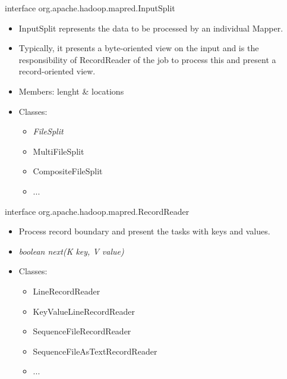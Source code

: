 \documentclass{beamer}
\begin{document}
\begin{frame}{interface org.apache.hadoop.mapred.InputSplit}
    \begin{itemize}
    \item InputSplit represents the data to be processed by an individual Mapper.
    \item Typically, it presents a byte-oriented view on the input and is the responsibility of RecordReader of the job to process this and present a record-oriented view. 
    \item Members: lenght \& locations
    \item Classes:
        \begin{itemize}
        \item \em{FileSplit}
        \item MultiFileSplit
        \item CompositeFileSplit
        \item ...
        \end{itemize}
    \end{itemize}
\end{frame}

\begin{frame}{interface org.apache.hadoop.mapred.RecordReader}
    \begin{itemize}
    \item Process record boundary and present the tasks with keys and values.
    \item \em{boolean next(K key, V value)}
    \item Classes:
        \begin{itemize}
        \item LineRecordReader
        \item KeyValueLineRecordReader
        \item SequenceFileRecordReader
        \item SequenceFileAsTextRecordReader
        \item ...
        \end{itemize}
    \end{itemize}
\end{frame}
\end{document}
